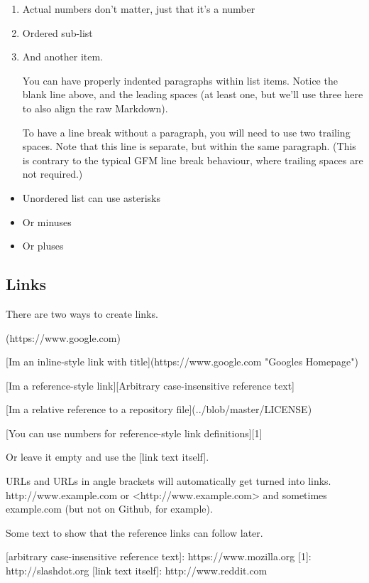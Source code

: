 \documentclass[
]{tufte-pandoc}
\newenvironment{Shaded}{}{}
\newcommand{\NormalTok}[1]{#1}
\providecommand{\tightlist}{%
  \setlength{\itemsep}{0pt}\setlength{\parskip}{0pt}}
\begin{document}
\begin{enumerate}
\def\labelenumi{\arabic{enumi}.}
\item
  Actual numbers don't matter, just that it's a number
\item
  Ordered sub-list
\item
  And another item.

  You can have properly indented paragraphs within list items. Notice
  the blank line above, and the leading spaces (at least one, but we'll
  use three here to also align the raw Markdown).

  To have a line break without a paragraph, you will need to use two
  trailing spaces. Note that this line is separate, but within the same
  paragraph. (This is contrary to the typical GFM line break behaviour,
  where trailing spaces are not required.)
\end{enumerate}

\begin{itemize}
\tightlist
\item
  Unordered list can use asterisks
\item
  Or minuses
\item
  Or pluses
\end{itemize}

\hypertarget{links}{%
\subsection{Links}\label{links}}

There are two ways to create links.

\begin{Shaded}
\begin{Highlighting}[]
\NormalTok{[I\textquotesingle{}m an inline{-}style link](https://www.google.com)}

\NormalTok{[I\textquotesingle{}m an inline{-}style link with title](https://www.google.com "Google\textquotesingle{}s Homepage")}

\NormalTok{[I\textquotesingle{}m a reference{-}style link][Arbitrary case{-}insensitive reference text]}

\NormalTok{[I\textquotesingle{}m a relative reference to a repository file](../blob/master/LICENSE)}

\NormalTok{[You can use numbers for reference{-}style link definitions][1]}

\NormalTok{Or leave it empty and use the [link text itself].}

\NormalTok{URLs and URLs in angle brackets will automatically get turned into links.}
\NormalTok{http://www.example.com or \textless{}http://www.example.com\textgreater{} and sometimes}
\NormalTok{example.com (but not on Github, for example).}

\NormalTok{Some text to show that the reference links can follow later.}

\NormalTok{[arbitrary case{-}insensitive reference text]: https://www.mozilla.org}
\NormalTok{[1]: http://slashdot.org}
\NormalTok{[link text itself]: http://www.reddit.com}
\end{Highlighting}
\end{Shaded}
\end{document}
